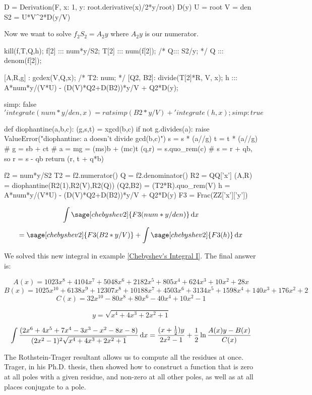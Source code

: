 \begin{sageblock}[chebyshev2]
D = Derivation(F, {x: 1, y: root.derivative(x)/2*y/root})
D(y)
U = root
V = den
S2 = U*V^2*D(y/V)
\end{sageblock}
Now we want to solve $f_2 S_2 = A_2 y$ where $A_2 y$ is our numerator.

\begin{maximablock}
kill(f,T,Q,h);
f[2] ::: num*y/S2;
T[2] ::: num(f[2]);
/* Q::: S2/y; */
Q ::: denom(f[2]);

[A,R,g] : gcdex(V,Q,x);
/* T2: num; */
[Q2, B2]: divide(T[2]*R, V, x);
h ::: A*num*y/(V*U) - (D(V)*Q2+D(B2))*y/V + Q2*D(y);

simp: false$
'integrate(num*y/den,x) = ratsimp(B2*y/V)
   + 'integrate(h,x);
simp: true$
\end{maximablock}

\begin{sageblock}[chebyshev2]
def diophantine(a,b,c):
   (g,s,t) = xgcd(b,c)
   if not g.divides(a):
      raise ValueError("diophantine: a doesn't divide gcd(b,c)")
   s = s * (a//g)
   t = t * (a//g)
   # g = sb + ct
   # a = mg = (ms)b + (mc)t
   (q,r) = s.quo_rem(c)
   # s = r + qb, so r = s - qb
   return (r, t + q*b)
\end{sageblock}

\begin{sageblock}[chebyshev2]
f2 = num*y/S2
T2 = f2.numerator()
Q = f2.denominator()
R2 = QQ['x']
(A,R) = diophantine(R2(1),R2(V),R2(Q))
(Q2,B2) = (T2*R).quo_rem(V)
h = A*num*y/(V*U) - (D(V)*Q2+D(B2))*y/V + Q2*D(y)
F3 = Frac(ZZ['x']['y'])
\end{sageblock}

$$\int \sage[chebyshev2]{F3(num*y/den)}\,{\rm d}x$$
$$=\sage[chebyshev2]{F3(B2*y/V)} + \int \sage[chebyshev2]{F3(h)}\,{\rm d}x$$

We solved this new integral in example \ref{Chebyshev's Integral I}.
The final answer is:

$$A(x) = 1023x^8+4104x^7+5048x^6+2182x^5+805x^4+624x^3+10x^2+28x$$
$$B(x) = 1025x^{10} + 6138x^9 + 12307x^8 + 10188x^7 + 4503x^6 + 3134x^5 + 1598x^4 + 140x^3 + 176x^2 +2$$
$$C(x) = 32x^{10}-80x^8+80x^6-40x^4+10x^2-1$$

$$y = \sqrt{x^4+4 x^3+2 x^2+1}$$

$$\int {{(2x^6+4x^5+7x^4-3x^3-x^2-8x-8)}\over{(2x^2-1)^2\sqrt{x^4+4 x^3+2 x^2+1}}} \,{\rm d}x
= {{(x+{1\over2})y}\over{2x^2-1}} + {1\over2}\ln{{A(x)y - B(x)}\over{C(x)}}
$$

\endexample


\vfill\eject
{}

The Rothstein-Trager resultant allows us to compute all the residues
at once.  Trager, in his Ph.D. thesis, then showed how to construct a
function that is zero at all poles with a given residue, and non-zero
at all other poles, as well as at all places conjugate to a pole.
